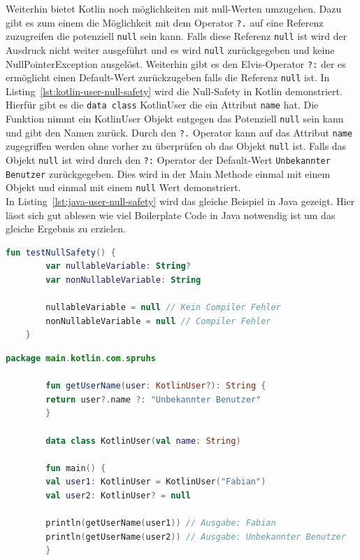 \documentclass[11pt]{article}
\begin{document}
    Weiterhin bietet Kotlin noch möglichkeiten mit null-Werten umzugehen.
    Dazu gibt es zum einem die Möglichkeit mit dem Operator \texttt{?.} auf eine Referenz zuzugreifen die potenziell \texttt{null} sein kann.
    Falls diese Referenz \texttt{null} ist wird der Ausdruck nicht weiter ausgeführt und es wird \texttt{null} zurückgegeben und keine NullPointerException ausgelöst.
    Weiterhin gibt es den Elvis-Operator \texttt{?:} der es ermöglicht einen Default-Wert zurückzugeben falls die Referenz \texttt{null} ist.
    In Listing~\ref{lst:kotlin-user-null-safety} wird die Null-Safety in Kotlin demonstriert.
    Hierfür gibt es die \texttt{data class} KotlinUser die ein Attribut \texttt{name} hat.
    Die Funktion nimmt ein KotlinUser Objekt entgegen das Potenziell \texttt{null} sein kann und gibt den Namen zurück.
    Durch den \texttt{?.} Operator kann auf das Attribut \texttt{name} zugegriffen werden ohne vorher zu überprüfen ob das Objekt \texttt{null} ist.
    Falls das Objekt \texttt{null} ist wird durch den \texttt{?:} Operator der Default-Wert \texttt{Unbekannter Benutzer} zurückgegeben.
    Dies wird in der Main Methode einmal mit einem Objekt und einmal mit einem \texttt{null} Wert demonstriert.\\
    In Listing~\ref{lst:java-user-null-safety} wird das gleiche Beispiel in Java gezeigt.
    Hier lässt sich gut ablesen wie viel Boilerplate Code in Java notwendig ist um das gleiche Ergebnis zu erzielen.




    \begin{lstlisting}[language=Kotlin, caption={KotlinNullSafety.kt}, label={lst:kotlin-null-safety}]
    fun testNullSafety() {
        var nullableVariable: String?
        var nonNullableVariable: String

        nullableVariable = null // Kein Compiler Fehler
        nonNullableVariable = null // Compiler Fehler
    }
    \end{lstlisting}

    \begin{lstlisting}[language=Kotlin, caption={KotlinUser.kt}, label={lst:kotlin-user-null-safety}]
        package main.kotlin.com.spruhs

        fun getUserName(user: KotlinUser?): String {
        return user?.name ?: "Unbekannter Benutzer"
        }

        data class KotlinUser(val name: String)

        fun main() {
        val user1: KotlinUser = KotlinUser("Fabian")
        val user2: KotlinUser? = null

        println(getUserName(user1)) // Ausgabe: Fabian
        println(getUserName(user2)) // Ausgabe: Unbekannter Benutzer
        }
    \end{lstlisting}
\end{document}
